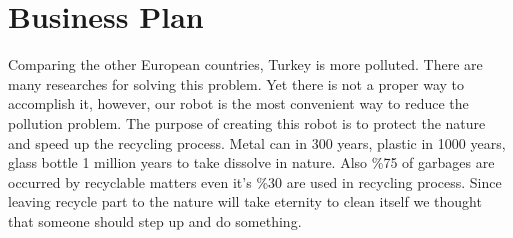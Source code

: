 \documentclass[12pt,a4paper]{article}
\begin{document}
 \section{Business Plan}
 \begin{flushleft}
  Comparing the other European countries, Turkey is more polluted. There are many researches for solving 
  this problem. Yet there is not a proper way to accomplish it, however, our robot is the most convenient 
  way to reduce the pollution problem. The purpose of creating this robot is to protect the nature and 
  speed up the recycling process. Metal can in 300 years, plastic in 1000 years, glass bottle 1 million 
  years to take dissolve in nature. Also \%75 of garbages are occurred by recyclable matters even it's \%30 
  are used in recycling process. Since leaving recycle part to the nature will take eternity to clean itself 
  we thought that someone should step up and do something. \\

 \end{flushleft}
\end{document}
